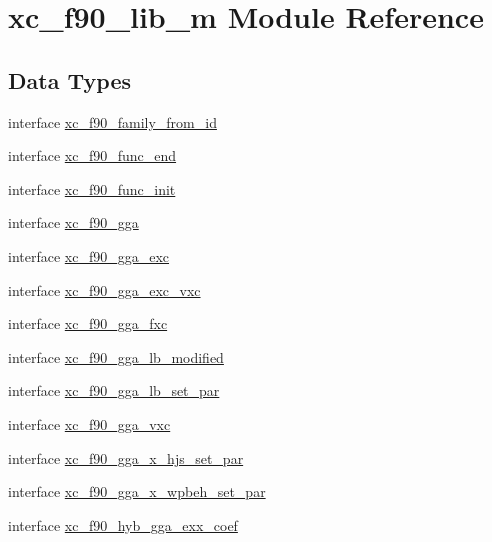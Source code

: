 \hypertarget{classxc__f90__lib__m}{\section{xc\-\_\-f90\-\_\-lib\-\_\-m Module Reference}
\label{classxc__f90__lib__m}
}
\subsection*{Data Types}
\begin{DoxyCompactItemize}
\item 
interface \hyperlink{interfacexc__f90__lib__m_1_1xc__f90__family__from__id}{xc\-\_\-f90\-\_\-family\-\_\-from\-\_\-id}
\item 
interface \hyperlink{interfacexc__f90__lib__m_1_1xc__f90__func__end}{xc\-\_\-f90\-\_\-func\-\_\-end}
\item 
interface \hyperlink{interfacexc__f90__lib__m_1_1xc__f90__func__init}{xc\-\_\-f90\-\_\-func\-\_\-init}
\item 
interface \hyperlink{interfacexc__f90__lib__m_1_1xc__f90__gga}{xc\-\_\-f90\-\_\-gga}
\item 
interface \hyperlink{interfacexc__f90__lib__m_1_1xc__f90__gga__exc}{xc\-\_\-f90\-\_\-gga\-\_\-exc}
\item 
interface \hyperlink{interfacexc__f90__lib__m_1_1xc__f90__gga__exc__vxc}{xc\-\_\-f90\-\_\-gga\-\_\-exc\-\_\-vxc}
\item 
interface \hyperlink{interfacexc__f90__lib__m_1_1xc__f90__gga__fxc}{xc\-\_\-f90\-\_\-gga\-\_\-fxc}
\item 
interface \hyperlink{interfacexc__f90__lib__m_1_1xc__f90__gga__lb__modified}{xc\-\_\-f90\-\_\-gga\-\_\-lb\-\_\-modified}
\item 
interface \hyperlink{interfacexc__f90__lib__m_1_1xc__f90__gga__lb__set__par}{xc\-\_\-f90\-\_\-gga\-\_\-lb\-\_\-set\-\_\-par}
\item 
interface \hyperlink{interfacexc__f90__lib__m_1_1xc__f90__gga__vxc}{xc\-\_\-f90\-\_\-gga\-\_\-vxc}
\item 
interface \hyperlink{interfacexc__f90__lib__m_1_1xc__f90__gga__x__hjs__set__par}{xc\-\_\-f90\-\_\-gga\-\_\-x\-\_\-hjs\-\_\-set\-\_\-par}
\item 
interface \hyperlink{interfacexc__f90__lib__m_1_1xc__f90__gga__x__wpbeh__set__par}{xc\-\_\-f90\-\_\-gga\-\_\-x\-\_\-wpbeh\-\_\-set\-\_\-par}
\item 
interface \hyperlink{interfacexc__f90__lib__m_1_1xc__f90__hyb__gga__exx__coef}{xc\-\_\-f90\-\_\-hyb\-\_\-gga\-\_\-exx\-\_\-coef}

\end{DoxyCompactItemize}
